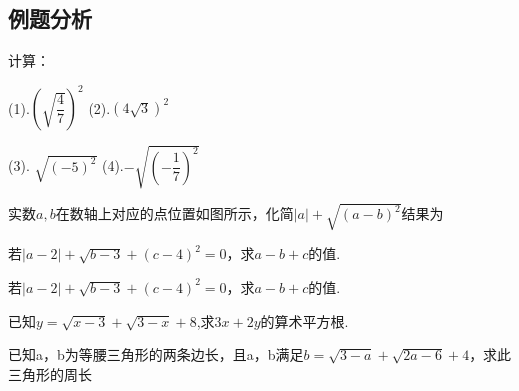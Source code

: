   \subsection{例题分析}
      \begin{example}   
            计算：\par
            (1).$(\sqrt{\dfrac{4}{7}})^2$   \hfil (2).$(4\sqrt{3})^2$\par 
            \vspace{2cm}
            (3). $\sqrt{(-5)^2}$ \hfil  (4).$-\sqrt{(-\dfrac{1}{7})^2}$ 
            \vspace{2cm}  
      \end{example} 
      \begin{example}
          实数$a,b$在数轴上对应的点位置如图所示，化简$|a|+\sqrt{(a-b)^2}$结果为\par
       
             
         \begin{figure}[h]
            \centering
             
       
          \caption{\label{fig: } }
        \end{figure}
      \end{example}
      \begin{example}
        若$|a-2|+\sqrt{b-3}+(c-4)^{2}=0$，求$a-b+c$的值.
      \end{example}
      \vspace{2cm}
      \begin{example}
        若$|a-2|+\sqrt{b-3}+(c-4)^{2}=0$，求$a-b+c$的值.
      \end{example}
      \vspace{2cm}
      
      \begin{example}
        已知$y=\sqrt{x-3}+\sqrt{3-x}+8$,求$3 x+2 y$的算术平方根.
      \end{example}
      \vspace{2cm}
      \begin{example}
        已知a，b为等腰三角形的两条边长，且a，b满足$b=\sqrt{3-a}+\sqrt{2 a-6}+4$，求此三角形的周长
      \end{example}
      \vspace{1.7cm}

